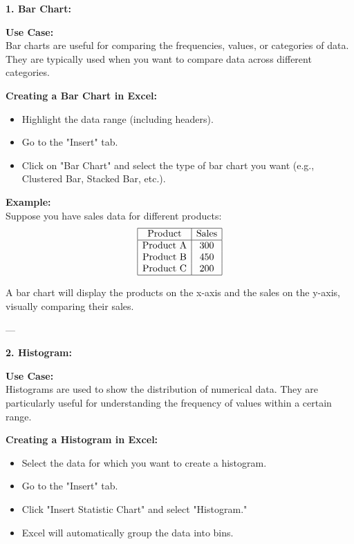 \documentclass[12pt,a4paper]{book}
\begin{document}
\clearpage 

\textbf{1. Bar Chart:}

\vspace{0.5cm}

\textbf{Use Case:} \\
Bar charts are useful for comparing the frequencies, values, or categories of data. They are typically used when you want to compare data across different categories.

\textbf{Creating a Bar Chart in Excel:}
\begin{itemize}
    \item Highlight the data range (including headers).
    \item Go to the "Insert" tab.
    \item Click on "Bar Chart" and select the type of bar chart you want (e.g., Clustered Bar, Stacked Bar, etc.).
\end{itemize}

\textbf{Example:} \\
Suppose you have sales data for different products:
\[
\begin{array}{|c|c|}
\hline
\text{Product} & \text{Sales} \\
\hline
\text{Product A} & 300 \\
\text{Product B} & 450 \\
\text{Product C} & 200 \\
\hline
\end{array}
\]

A bar chart will display the products on the x-axis and the sales on the y-axis, visually comparing their sales.

---

\textbf{2. Histogram:}

\vspace{0.5cm}

\textbf{Use Case:} \\
Histograms are used to show the distribution of numerical data. They are particularly useful for understanding the frequency of values within a certain range.

\textbf{Creating a Histogram in Excel:}
\begin{itemize}
    \item Select the data for which you want to create a histogram.
    \item Go to the "Insert" tab.
    \item Click "Insert Statistic Chart" and select "Histogram."
    \item Excel will automatically group the data into bins.
\end{itemize}
\end{document}
